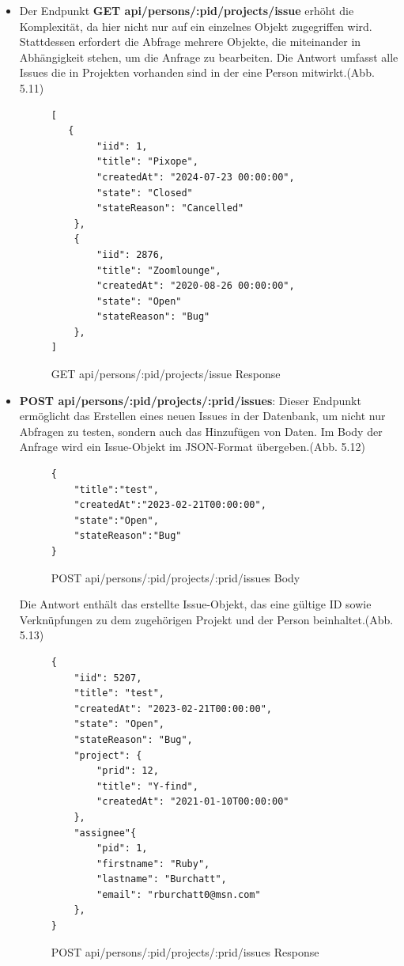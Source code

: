 \begin{itemize}
\item Der Endpunkt \textbf{GET api/persons/:pid/projects/issue} erhöht die Komplexität, da hier nicht nur auf ein einzelnes Objekt zugegriffen wird. Stattdessen erfordert die Abfrage mehrere Objekte, die miteinander in Abhängigkeit stehen, um die Anfrage zu bearbeiten. Die Antwort umfasst alle Issues die in Projekten vorhanden sind in der eine Person mitwirkt.(Abb. 5.11)
\begin{figure}[H]
\begin{center}
\begin{BVerbatim}
[
   {
        "iid": 1,
        "title": "Pixope",
        "createdAt": "2024-07-23 00:00:00",
        "state": "Closed"
        "stateReason": "Cancelled"
    },
    {
        "iid": 2876,
        "title": "Zoomlounge",
        "createdAt": "2020-08-26 00:00:00",
        "state": "Open"
        "stateReason": "Bug"
    },
]
\end{BVerbatim}
\end{center}
\caption{GET api/persons/:pid/projects/issue Response}
\end{figure}

\item \textbf{POST api/persons/:pid/projects/:prid/issues}: Dieser Endpunkt ermöglicht das Erstellen eines neuen Issues in der Datenbank, um nicht nur Abfragen zu testen, sondern auch das Hinzufügen von Daten. Im Body der Anfrage wird ein Issue-Objekt im JSON-Format übergeben.(Abb. 5.12) 
\newline
\begin{figure}[H]
\begin{center}
\begin{BVerbatim}
{
    "title":"test",
    "createdAt":"2023-02-21T00:00:00",
    "state":"Open",
    "stateReason":"Bug"
}
\end{BVerbatim}
\end{center}
\caption{POST api/persons/:pid/projects/:prid/issues Body}
\end{figure}
Die Antwort enthält das erstellte Issue-Objekt, das eine gültige ID sowie Verknüpfungen zu dem zugehörigen Projekt und der Person beinhaltet.(Abb. 5.13)
\begin{figure}[H]
\begin{center}
\begin{BVerbatim}
{
    "iid": 5207,
    "title": "test",
    "createdAt": "2023-02-21T00:00:00",
    "state": "Open",
    "stateReason": "Bug",
    "project": {
        "prid": 12,
        "title": "Y-find",
        "createdAt": "2021-01-10T00:00:00"
    },
    "assignee"{
        "pid": 1,
        "firstname": "Ruby",
        "lastname": "Burchatt",
        "email": "rburchatt0@msn.com"
    },
}
\end{BVerbatim}
\end{center}
\caption{POST api/persons/:pid/projects/:prid/issues Response}
\end{figure}
\end{itemize}

